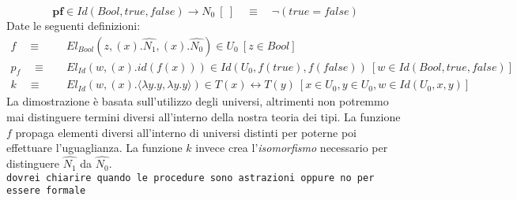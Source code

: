 \begin{displaymath}
    \textbf{pf} \in Id(Bool, true, false) \rightarrow N_0\ [\ ]\quad \equiv\quad \neg (true = false)
\end{displaymath}
Date le seguenti definizioni:
\begin{align*}
    f\quad \equiv&\quad El_{Bool}(z, (x).\hat{N_1}, (x).\hat{N_0}) \in U_0\ [z \in Bool]\\
    p_f\quad \equiv&\quad El_{Id}(w, (x).id(f(x))) \in Id(U_0, f(true), f(false))\ [w \in Id(Bool, true, false)]\\
    k\quad \equiv&\quad El_{Id}(w, (x).\langle \lambda y.y, \lambda y.y \rangle) \in T(x) \leftrightarrow T(y)\ [x \in U_0, y \in U_0, w \in Id(U_0, x, y)]
\end{align*}
La dimostrazione è basata sull'utilizzo degli universi, altrimenti non potremmo mai distinguere termini diversi all'interno della nostra teoria dei tipi.
La funzione $f$ propaga elementi diversi all'interno di universi distinti per poterne poi effettuare l'uguaglianza.
La funzione $k$ invece crea l'\textit{isomorfismo} necessario per distinguere $\hat{N_1}$ da $\hat{N_0}$.\\
\texttt{dovrei chiarire quando le procedure sono astrazioni oppure no per essere formale}
